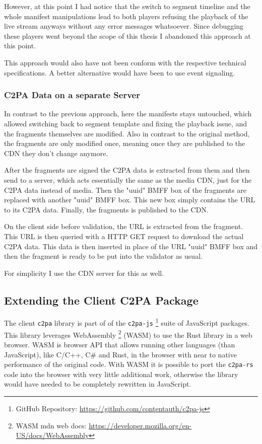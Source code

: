 However, at this point I had notice that the switch to segment timeline and the whole manifest manipulations lead to both players refusing the playback of the live stream anyways without any error messages whatsoever. Since debugging these players went beyond the scope of this thesis I abandoned this approach at this point. 

This approach would also have not been conform with the respective technical specifications. A better alternative would have been to use event signaling. 

\subsubsection{C2PA Data on a separate Server\label{sec:on_server}}

In contrast to the previous approach, here the manifests stays untouched, which allowed switching back to segment template and fixing the playback issue, and the fragments themselves are modified. Also in contrast to the original method, the fragments are only modified once, meaning once they are published to the CDN they don't change anymore.

After the fragments are signed the C2PA data is extracted from them and then send to a server, which acts essentially the same as the media CDN, just for the C2PA data instead of media. Then the "uuid" BMFF box of the fragments are replaced with another "uuid" BMFF box. This new box simply contains the URL to its C2PA data. Finally, the fragments is published to the CDN.

On the client side before validation, the URL is extracted from the fragment. This URL is then queried with a HTTP GET request to download the actual C2PA data. This data is then inserted in place of the URL "uuid" BMFF box and then the fragment is ready to be put into the validator as usual.

For simplicity I use the CDN server for this as well.

\subsection{Extending the Client C2PA Package\label{sec:wasm}}

The client \texttt{c2pa} library is part of of the \texttt{c2pa-js} \footnote{GitHub Repository: \url{https://github.com/contentauth/c2pa-js}} suite of JavaScript packages. This library leverages WebAssembly \footnote{WASM mdn web docs: \url{https://developer.mozilla.org/en-US/docs/WebAssembly}} (WASM) to use the Rust library in a web browser. WASM is browser API that allows running other languages (than JavaScript), like C/C++, C$\#$ and Rust, in the browser with near to native performance of the original code. With WASM it is possible to port the \texttt{c2pa-rs} code into the browser with very little additional work, otherwise the library would have needed to be completely rewritten in JavaScript.

